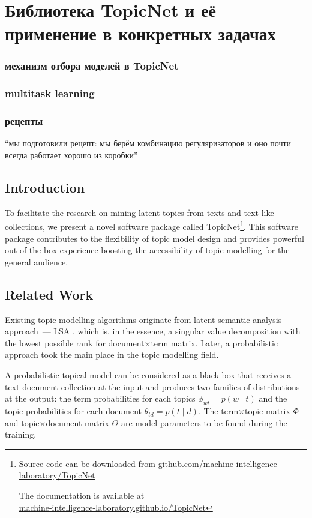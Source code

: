 \chapter{Библиотека TopicNet и её применение в конкретных задачах}

\subsection{механизм отбора моделей в TopicNet}
\subsection{multitask learning}
\subsection{рецепты}
“мы подготовили рецепт: мы берём комбинацию регуляризаторов и оно почти всегда работает хорошо из коробки”


\section{Introduction}

To facilitate the research on mining latent topics from texts and text-like collections, we present a novel software package called TopicNet\footnote{Source code can be downloaded from \url{github.com/machine-intelligence-laboratory/TopicNet} \par The documentation is available at \\ \url{machine-intelligence-laboratory.github.io/TopicNet} }. This software package contributes to the flexibility of topic model design and provides powerful out-of-the-box experience boosting the accessibility of topic modelling for the general audience.

\section{Related Work}

Existing topic modelling algorithms originate from latent semantic analysis approach~--- LSA \cite{deerwester1990indexing}, which is, in the essence, a singular value decomposition with the lowest possible rank for document$\times$term matrix. Later, a probabilistic approach took the main place in the topic modelling field.

A probabilistic topical model can be considered as a black box that receives a text document collection at the input and produces two families of distributions at the output: the term probabilities for each topics $\phi_{wt} = p(w \mid t)$ and the topic probabilities for each document $\theta_{td} = p(t \mid d)$. The term$\times$topic matrix $\Phi$ and topic$\times$document matrix $\Theta$ are model parameters to be found during the training.

